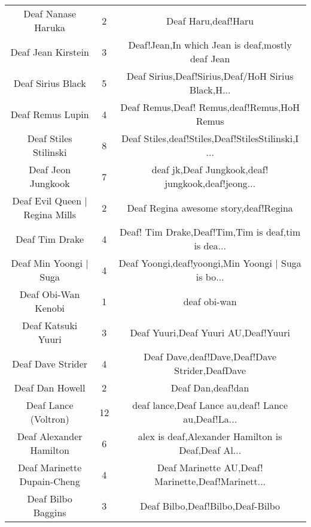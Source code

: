 \begin{table}[h!]
{\begin{tabular}{|c|c|c|}
                                Deaf Nanase Haruka &      2 &                                Deaf Haru,deaf!Haru \\
                                Deaf Jean Kirstein &      3 &   Deaf!Jean,In which Jean is deaf,mostly deaf Jean \\
                                 Deaf Sirius Black &      5 & Deaf Sirius,Deaf!Sirius,Deaf/HoH Sirius Black,H... \\
                                  Deaf Remus Lupin &      4 &        Deaf Remus,Deaf! Remus,deaf!Remus,HoH Remus \\
                             Deaf Stiles Stilinski &      8 & Deaf Stiles,deaf!Stiles,Deaf!StilesStilinski,I ... \\
                                Deaf Jeon Jungkook &      7 & deaf jk,Deaf Jungkook,deaf! jungkook,deaf!jeong... \\
                    Deaf Evil Queen | Regina Mills &      2 &              Deaf Regina awesome story,deaf!Regina \\
                                    Deaf Tim Drake &      4 & Deaf! Tim Drake,Deaf!Tim,Tim is deaf,tim is dea... \\
                            Deaf Min Yoongi | Suga &      4 & Deaf Yoongi,deaf!yoongi,Min Yoongi | Suga is bo... \\
                               Deaf Obi-Wan Kenobi &      1 &                                       deaf obi-wan \\
                                Deaf Katsuki Yuuri &      3 &                Deaf Yuuri,Deaf Yuuri AU,Deaf!Yuuri \\
                                 Deaf Dave Strider &      4 &     Deaf Dave,deaf!Dave,Deaf!Dave Strider,DeafDave \\
                                   Deaf Dan Howell &      2 &                                  Deaf Dan,deaf!dan \\
                              Deaf Lance (Voltron) &     12 & deaf lance,Deaf Lance au,deaf! Lance au,Deaf!La... \\
                           Deaf Alexander Hamilton &      6 & alex is deaf,Alexander Hamilton is Deaf,Deaf Al... \\
                       Deaf Marinette Dupain-Cheng &      4 & Deaf Marinette AU,Deaf! Marinette,Deaf!Marinett... \\
                                Deaf Bilbo Baggins &      3 &                   Deaf Bilbo,Deaf!Bilbo,Deaf-Bilbo \\

\end{tabular}}
\end{table}
